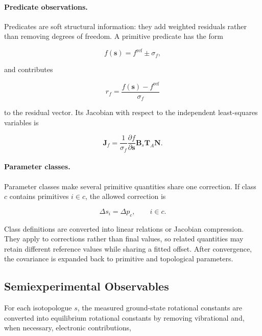 \documentclass[aip,jcp,reprint,longbibliography,floatfix]{revtex4-2}
\begin{document}
\paragraph{Predicate observations.}

Predicates are soft structural information: they add weighted residuals rather
than removing degrees of freedom.\cite{Bartell1975Predicate} A primitive
predicate has the form

\begin{equation}
f(\mathbf{s})
=
f^{\mathrm{ref}}
\pm
\sigma_f ,
\end{equation}

and contributes

\begin{equation}
r_f
=
\frac{f(\mathbf{s})-f^{\mathrm{ref}}}{\sigma_f}
\end{equation}

to the residual vector. Its Jacobian with respect to the independent
least-squares variables is

\begin{equation}
\mathbf{J}_f
=
\frac{1}{\sigma_f}
\frac{\partial f}{\partial\mathbf{s}}
\mathbf{B}_s
\mathbf{T}_{A}
\mathbf{N}.
\end{equation}

\paragraph{Parameter classes.}

Parameter classes make several primitive quantities share one correction. If
class $c$ contains primitives $i\in c$, the allowed correction is

\begin{equation}
\Delta s_i
=
\Delta p_c,
\qquad
i\in c .
\end{equation}

Class definitions are converted into linear relations or Jacobian compression.
They apply to corrections rather than final values, so related quantities may
retain different reference values while sharing a fitted offset. After
convergence, the covariance is expanded back to primitive and topological
parameters.


\subsection{Semiexperimental Observables}

For each isotopologue $s$, the measured ground-state rotational constants are
converted into equilibrium rotational constants by removing vibrational and,
when necessary, electronic contributions,\cite{Costain1958,Pawlowski2002,Piccardo2015B3LYP,Penocchio2015B2PLYP}
\end{document}
